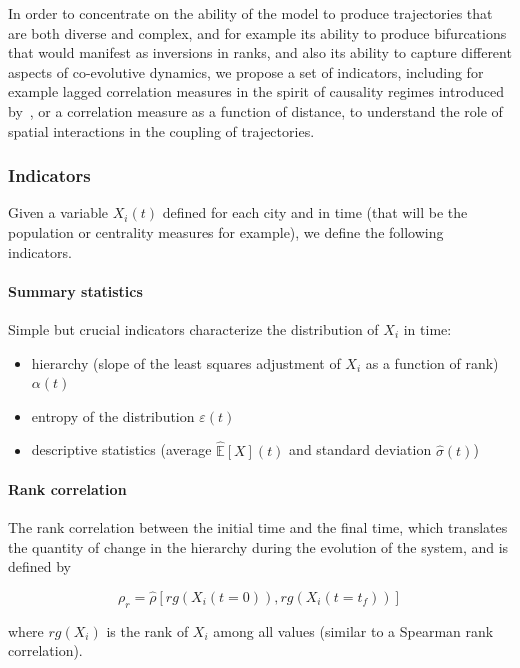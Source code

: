 In order to concentrate on the ability of the model to produce trajectories that are both diverse and complex, and for example its ability to produce bifurcations that would manifest as inversions in ranks, and also its ability to capture different aspects of co-evolutive dynamics, we propose a set of indicators, including for example lagged correlation measures in the spirit of causality regimes introduced by~\cite{raimbault2017identification}, or a correlation measure as a function of distance, to understand the role of spatial interactions in the coupling of trajectories.

\subsubsection{Indicators}

Given a variable $X_i(t)$ defined for each city and in time (that will be the population or centrality measures for example), we define the following indicators.

\paragraph{Summary statistics}

Simple but crucial indicators characterize the distribution of $X_i$ in time:
\begin{itemize}
	\item hierarchy (slope of the least squares adjustment of $X_i$ as a function of rank) $\alpha (t)$
	\item entropy of the distribution $\varepsilon (t)$
	\item descriptive statistics (average $\hat{\mathbb{E}}\left[X\right] (t)$ and standard deviation $\hat{\sigma} (t)$)
\end{itemize}


\paragraph{Rank correlation}

The rank correlation between the initial time and the final time, which translates the quantity of change in the hierarchy during the evolution of the system, and is defined by

\begin{equation}
\rho_r = \hat{\rho}\left[rg(X_i(t=0)),rg(X_i(t=t_f))\right]
\end{equation}

where $rg(X_i)$ is the rank of $X_i$ among all values (similar to a Spearman rank correlation).


